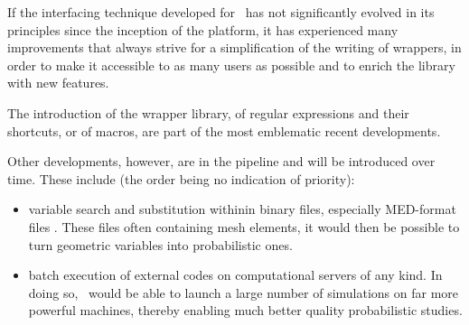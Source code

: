
If the interfacing technique developed for \OT\ has not significantly evolved in its principles since the inception of the platform, it has experienced many improvements that always strive for a simplification of the writing of wrappers, in order to make it accessible to as many users as possible and to enrich the library with new features.

The introduction of the wrapper library, of regular expressions and their shortcuts, or of macros, are part of the most emblematic recent developments.

Other developments, however, are in the pipeline and will be introduced over time. These include (the order being no indication of priority):
\begin{itemize}
\item variable search and substitution withinin binary files, especially MED-format files%
. These files often containing mesh elements, it would then be possible to turn geometric variables into probabilistic ones.
\item batch execution of external codes on computational servers of any kind. In doing so, \OT\ would be able to launch a large number of simulations on far more powerful machines, thereby enabling much better quality probabilistic studies.
\end{itemize}
